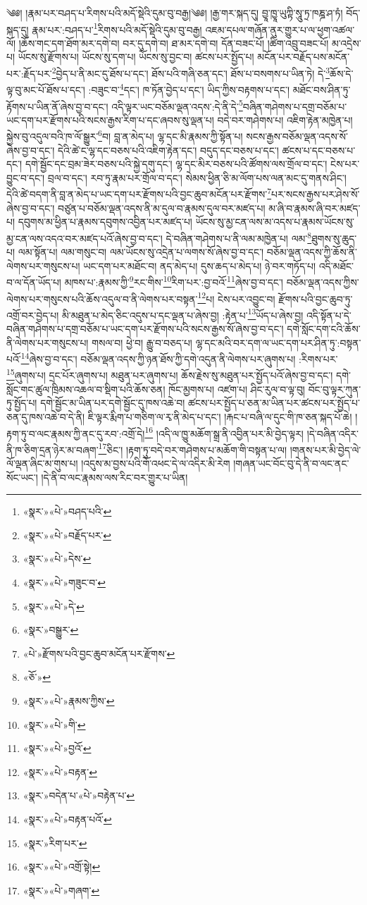 ༄༅། །རྣམ་པར་བཤད་པ་རིགས་པའི་མདོ་སྡེའི་དུམ་བུ་བརྒྱ།༄༅། །རྒྱ་གར་སྐད་དུ། བྱཱ་ཁྱཱ་ཡུཀྟི་སཱུ་ཏྲ་ཁཎྜ་ཤ་ཏཾ། བོད་སྐད་དུ། རྣམ་པར་:བཤད་པ་\footnote{«སྣར་»«པེ་»བཤད་པའི་}རིགས་པའི་མདོ་སྡེའི་དུམ་བུ་བརྒྱ། འཇམ་དཔལ་གཞོན་ནུར་གྱུར་པ་ལ་ཕྱག་འཚལ་ལོ། །ཆོས་གང་དག་ཐོག་མར་དགེ་བ། བར་དུ་དགེ་བ། ཐ་མར་དགེ་བ། དོན་བཟང་པོ། །ཚིག་འབྲུ་བཟང་པོ། མ་འདྲེས་པ། ཡོངས་སུ་རྫོགས་པ། ཡོངས་སུ་དག་པ། ཡོངས་སུ་བྱང་བ། ཚངས་པར་སྤྱོད་པ། མངོན་པར་བརྗོད་པས་མངོན་པར་:རྗོད་པར་\footnote{«སྣར་»«པེ་»བརྗོད་པར་}བྱེད་པ་ནི་མང་དུ་ཐོས་པ་དང་། ཐོས་པའི་གཞི་ཅན་དང་། ཐོས་པ་བསགས་པ་ཡིན་ཏེ། དེ་\footnote{«སྣར་»«པེ་»དེས་}ཆོས་དེ་ལྟ་བུ་མང་པོ་ཐོས་པ་དང་། :བཟུང་བ་\footnote{«སྣར་»«པེ་»གཟུང་བ་}དང་། ཁ་ཏོན་བྱེད་པ་དང་། ཡིད་ཀྱིས་བརྟགས་པ་དང་། མཐོང་བས་ཤིན་ཏུ་རྟོགས་པ་ཡིན་ནོ་ཞེས་བྱ་བ་དང་། འདི་ལྟར་ཡང་བཅོམ་ལྡན་འདས་:དེ་ནི་དེ་\footnote{«སྣར་»«པེ་»དེ་}བཞིན་གཤེགས་པ་དགྲ་བཅོམ་པ་ཡང་དག་པར་རྫོགས་པའི་སངས་རྒྱས་རིག་པ་དང་ཞབས་སུ་ལྡན་པ། བདེ་བར་གཤེགས་པ། འཇིག་རྟེན་མཁྱེན་པ། སྐྱེས་བུ་འདུལ་བའི་ཁ་ལོ་སྒྱུར་\footnote{«སྣར་»བསྒྱུར་}བ། བླ་ན་མེད་པ། ལྷ་དང་མི་རྣམས་ཀྱི་སྟོན་པ། སངས་རྒྱས་བཅོམ་ལྡན་འདས་སོ་ཞེས་བྱ་བ་དང་། དེའི་ཚེ་ང་ལྷ་དང་བཅས་པའི་འཇིག་རྟེན་དང་། བདུད་དང་བཅས་པ་དང་། ཚངས་པ་དང་བཅས་པ་དང་། དགེ་སྦྱོང་དང་བྲམ་ཟེར་བཅས་པའི་སྐྱེ་དགུ་དང་། ལྷ་དང་མིར་བཅས་པའི་ཚོགས་ལས་གྲོལ་བ་དང་། ངེས་པར་བྱུང་བ་དང་། བྲལ་བ་དང་། རབ་ཏུ་རྣམ་པར་གྲོལ་བ་དང་། སེམས་ཕྱིན་ཅི་མ་ལོག་པས་ལན་མང་དུ་གནས་ཤིང་། དེའི་ཚེ་བདག་ནི་བླ་ན་མེད་པ་ཡང་དག་པར་རྫོགས་པའི་བྱང་ཆུབ་མངོན་པར་རྫོགས་\footnote{«པེ་»རྫོགས་པའི་བྱང་ཆུབ་མངོན་པར་རྫོགས་}པར་སངས་རྒྱས་པར་ཤེས་སོ་ཞེས་བྱ་བ་དང་། བཙུན་པ་བཅོམ་ལྡན་འདས་ནི་མ་དུལ་བ་རྣམས་དུལ་བར་མཛད་པ། མ་ཞི་བ་རྣམས་ཞི་བར་མཛད་པ། དབུགས་མ་ཕྱིན་པ་རྣམས་དབུགས་འབྱིན་པར་མཛད་པ། ཡོངས་སུ་མྱ་ངན་ལས་མ་འདས་པ་རྣམས་ཡོངས་སུ་མྱ་ངན་ལས་འདའ་བར་མཛད་པའོ་ཞེས་བྱ་བ་དང་། དེ་བཞིན་གཤེགས་པ་ནི་ལམ་མཁྱེན་པ། ལམ་\footnote{«ཅོ་»}ཐུགས་སུ་ཆུད་པ། ལམ་སྟོན་པ། ལམ་གསུང་བ། ལམ་ཡོངས་སུ་འདྲེན་པ་ལགས་སོ་ཞེས་བྱ་བ་དང་། བཅོམ་ལྡན་འདས་ཀྱི་ཆོས་ནི་ལེགས་པར་གསུངས་པ། ཡང་དག་པར་མཐོང་བ། ནད་མེད་པ། དུས་ཆད་པ་མེད་པ། ཉེ་བར་གཏོད་པ། འདི་མཐོང་བ་ལ་དོན་ཡོད་པ། མཁས་པ་:རྣམས་ཀྱི་\footnote{«སྣར་»«པེ་»རྣམས་ཀྱིས་}རང་གིས་\footnote{«སྣར་»«པེ་»གི་}རིག་པར་:བྱ་བའོ་\footnote{«སྣར་»«པེ་»བྱའོ་}ཞེས་བྱ་བ་དང་། བཅོམ་ལྡན་འདས་ཀྱིས་ལེགས་པར་གསུངས་པའི་ཆོས་འདུལ་བ་ནི་ལེགས་པར་བསྟན་\footnote{«སྣར་»«པེ་»བརྟན་}པ། ངེས་པར་འབྱུང་བ། རྫོགས་པའི་བྱང་ཆུབ་ཏུ་འགྲོ་བར་བྱེད་པ། མི་མཐུན་པ་མེད་ཅིང་འདུས་པ་དང་ལྡན་པ་ཞེས་བྱ། :རྟེན་པ་\footnote{«སྣར་»བདེན་པ་«པེ་»བརྟེན་པ་}ཡོད་པ་ཞེས་བྱ། འདི་སྟོན་པ་དེ་བཞིན་གཤེགས་པ་དགྲ་བཅོམ་པ་ཡང་དག་པར་རྫོགས་པའི་སངས་རྒྱས་སོ་ཞེས་བྱ་བ་དང་། དགེ་སློང་དག་ངའི་ཆོས་ནི་ལེགས་པར་གསུངས་པ། གསལ་བ། ཕྱེ་བ། རྒྱུ་བ་བཅད་པ། ལྷ་དང་མའི་བར་དག་ལ་ཡང་དག་པར་ཤིན་ཏུ་:བསྟན་པའོ་\footnote{«སྣར་»«པེ་»བརྟན་པའོ་}ཞེས་བྱ་བ་དང་། བཅོམ་ལྡན་འདས་ཀྱི་ཉན་ཐོས་ཀྱི་དགེ་འདུན་ནི་ལེགས་པར་ཞུགས་པ། :རིགས་པར་\footnote{«སྣར་»རིག་པར་}ཞུགས་པ། དྲང་པོར་ཞུགས་པ། མཐུན་པར་ཞུགས་པ། ཆོས་རྗེས་སུ་མཐུན་པར་སྤྱོད་པའོ་ཞེས་བྱ་བ་དང་། དགེ་སློང་གང་ཚུལ་ཁྲིམས་འཆལ་བ་སྡིག་པའི་ཆོས་ཅན། ཁོང་མྱགས་པ། འཛག་པ། ཤིང་རུལ་བ་ལྟ་བུ། བོང་བུ་ལྟར་ཀུན་ཏུ་སྤྱོད་པ། དགེ་སྦྱོང་མ་ཡིན་པར་དགེ་སྦྱོང་དུ་ཁས་འཆེ་བ། ཚངས་པར་སྤྱོད་པ་ཅན་མ་ཡིན་པར་ཚངས་པར་སྤྱོད་པ་ཅན་དུ་ཁས་འཆེ་བ་དེ་ནི། ཇི་ལྟར་རྨིག་པ་གཅིག་ལ་རྭ་ནི་མེད་པ་དང་། །རྐང་པ་བཞི་ལ་དུང་གི་ཁ་ཅན་སྐད་པོ་ཆེ། །རྟག་ཏུ་བ་ལང་རྣམས་ཀྱི་ནང་དུ་རབ་:འགྲོ་དེ།\footnote{«སྣར་»«པེ་»འགྲོ་སྟེ།} །འདི་ལ་ཁྱུ་མཆོག་སྒྲ་ནི་འབྱིན་པར་མི་བྱེད་ལྟར། །དེ་བཞིན་འདིར་ནི་ཁ་ཅིག་དྲན་ཉེར་མ་བཞག་\footnote{«སྣར་»«པེ་»གཞག་}ཅིང་། །རྟག་ཏུ་བདེ་བར་གཤེགས་པ་མཆོག་གི་བསྟན་པ་ལ། །གནས་པར་མི་བྱེད་ལེ་ལོ་ལྡན་ཞིང་མ་གུས་པ། །འདུས་མ་བྱས་པའི་གོ་འཕང་དེ་ལ་འདིར་མི་རེག །གཞན་ཡང་བོང་བུ་དེ་ནི་བ་ལང་ནང་སོང་ཡང་། །དེ་ནི་བ་ལང་རྣམས་ལས་རིང་བར་གྱུར་པ་ཡིན། 
